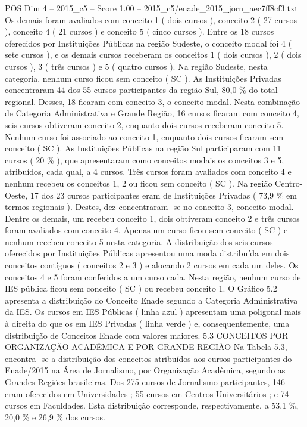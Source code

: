 \begin{textsample}{POS Dim 4 – 2015\_c5 – Score 1.00 – 2015\_c5/enade\_2015\_jorn\_aec7ff8cf3.txt}
Os demais foram avaliados com conceito 1 ( dois cursos ), conceito 2 ( 27 cursos ), conceito 4 ( 21 cursos ) e conceito 5 ( cinco cursos ).
Entre os 18 cursos oferecidos por Instituições Públicas na região Sudeste, o conceito modal foi 4 ( sete cursos ), e os demais cursos receberam os conceitos 1 ( dois cursos ), 2 ( dois cursos ), 3 ( três cursos ) e 5 ( quatro cursos ).
Na região Sudeste, nesta categoria, nenhum curso ficou sem conceito ( SC ).
As Instituições Privadas concentraram 44 dos 55 cursos participantes da região Sul, 80,0 \% do total regional.
Desses, 18 ficaram com conceito 3, o conceito modal.
Nesta combinação de Categoria Administrativa e Grande Região, 16 cursos ficaram com conceito 4, seis cursos obtiveram conceito 2, enquanto dois cursos receberam conceito 5.
Nenhum curso foi associado ao conceito 1, enquanto dois cursos ficaram sem conceito ( SC ).
As Instituições Públicas na região Sul participaram com 11 cursos ( 20 \% ), que apresentaram como conceitos modais os conceitos 3 e 5, atribuídos, cada qual, a 4 cursos.
Três cursos foram avaliados com conceito 4 e nenhum recebeu os conceitos 1, 2 ou ficou sem conceito ( SC ).
Na região Centro-Oeste, 17 dos 23 cursos participantes eram de Instituições Privadas ( 73,9 \% em termos regionais ).
Destes, dez concentraram -se no conceito 3, conceito modal.
Dentre os demais, um recebeu conceito 1, dois obtiveram conceito 2 e três cursos foram avaliados com conceito 4.
Apenas um curso ficou sem conceito ( SC ) e nenhum recebeu conceito 5 nesta categoria.
A distribuição dos seis cursos oferecidos por Instituições Públicas apresentou uma moda distribuída em dois conceitos contíguos ( conceitos 2 e 3 ) e alocando 2 cursos em cada um deles.
Os conceitos 4 e 5 foram conferidos a um curso cada.
Nesta região, nenhum curso de IES pública ficou sem conceito ( SC ) ou recebeu conceito 1.
O Gráfico 5.2 apresenta a distribuição do Conceito Enade segundo a Categoria Administrativa da IES.
Os cursos em IES Públicas ( linha azul ) apresentam uma poligonal mais à direita do que os em IES Privadas ( linha verde ) e, consequentemente, uma distribuição de Conceitos Enade com valores maiores. 5.3 CONCEITOS POR ORGANIZAÇÃO ACADÊMICA E POR GRANDE REGIÃO Na Tabela 5.3, encontra -se a distribuição dos conceitos atribuídos aos cursos participantes do Enade/2015 na Área de Jornalismo, por Organização Acadêmica, segundo as Grandes Regiões brasileiras.
Dos 275 cursos de Jornalismo participantes, 146 eram oferecidos em Universidades ; 55 cursos em Centros Universitários ; e 74 cursos em Faculdades.
Esta distribuição corresponde, respectivamente, a 53,1 \%, 20,0 \% e 26,9 \% dos cursos.

\end{textsample}
